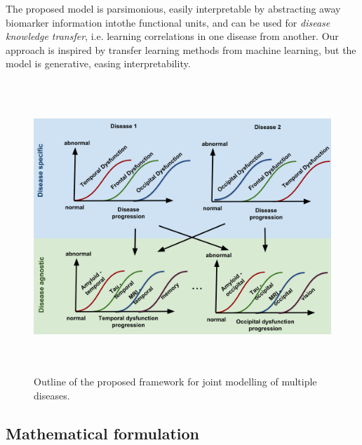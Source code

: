 \documentclass[11pt,a4paper]{article}
\begin{document}
The proposed model is parsimonious, easily interpretable by abstracting away biomarker information intothe functional units, and can be used for \emph{disease knowledge transfer}, i.e. learning correlations in one disease from another. Our approach is inspired by transfer learning methods from machine learning, but the model is generative, easing interpretability.   


\begin{figure}[h]
 \centering
 \includegraphics[height=11cm]{figures/disease_knowledge_transfer.png}
 \caption{Outline of the proposed framework for joint modelling of multiple diseases. }
\end{figure}

\subsection{Mathematical formulation}
\end{document}
